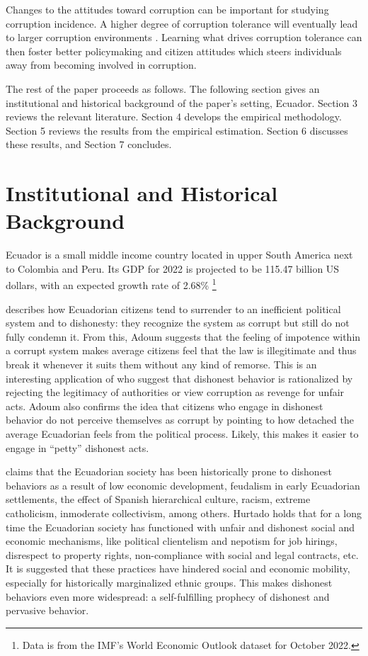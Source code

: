 \documentclass[12pt,a4]{article}\usepackage[]{graphicx}\usepackage[]{xcolor}
\begin{document}
Changes to the attitudes toward corruption can be important for studying corruption incidence. A higher degree of corruption tolerance will eventually lead to larger corruption environments \parencite{Campbell.2014}. Learning what drives corruption tolerance can then foster better policymaking and citizen attitudes which steers individuals away from becoming involved in corruption.

The rest of the paper proceeds as follows. The following section gives an institutional and historical background of the paper's setting, Ecuador. Section 3 reviews the relevant literature. Section 4 develops the empirical methodology. Section 5 reviews the results from the empirical estimation. Section 6 discusses these results, and Section 7 concludes. 




\section{Institutional and Historical Background}
\label{sec:background}

Ecuador is a small middle income country located in upper South America next to Colombia and Peru. Its GDP for 2022 is projected to be 115.47 billion US dollars, with an expected growth rate of 2.68\% \footnote{Data is from the IMF's World Economic Outlook dataset for October 2022.}

\textcite{Adoum.2000} describes how Ecuadorian citizens tend to surrender to an inefficient political system and to dishonesty: they recognize the system as corrupt but still do not fully condemn it. From this, Adoum suggests that the feeling of impotence within a corrupt system makes average citizens feel that the law is illegitimate and thus break it whenever it suits them without any kind of remorse. This is an interesting application of \textcite{Ashforth.2003} who suggest that dishonest behavior is rationalized by rejecting the legitimacy of authorities or view corruption as revenge for unfair acts. Adoum also confirms the idea that citizens who engage in dishonest behavior do not perceive themselves as corrupt by pointing to how detached the average Ecuadorian feels from the political process. Likely, this makes it easier to engage in \enquote{petty} dishonest acts.

\textcite{Hurtado.2007} claims that the Ecuadorian society has been historically prone to dishonest behaviors as a result of low economic development, feudalism in early Ecuadorian settlements, the effect of Spanish hierarchical culture, racism, extreme catholicism, inmoderate collectivism, among others. Hurtado holds that for a long time the Ecuadorian society has functioned with unfair and dishonest social and economic mechanisms, like political clientelism and nepotism for job hirings, disrespect to property rights, non-compliance with social and legal contracts, etc. It is suggested that these practices have hindered social and economic mobility, especially for historically marginalized ethnic groups. This makes dishonest behaviors even more widespread: a self-fulfilling prophecy of dishonest and pervasive behavior. 
\end{document}
